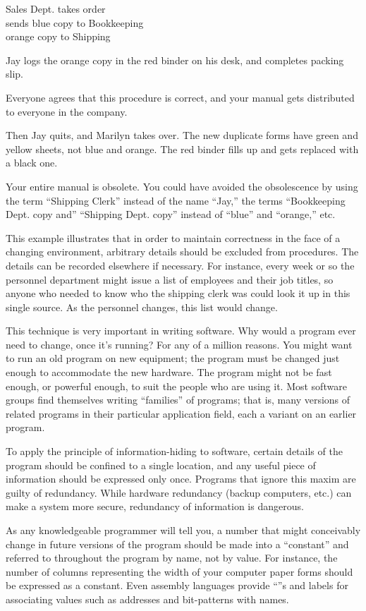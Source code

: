 \begin{tfquot}
Sales Dept. takes order\\
sends blue copy to Bookkeeping\\
orange copy to Shipping

Jay logs the orange copy in the red binder on his desk, and completes
packing slip.
\end{tfquot}
Everyone agrees that this procedure is correct, and your manual gets
distributed to everyone in the company.

Then Jay quits, and Marilyn takes over. The new duplicate forms have
green and yellow sheets, not blue and orange. The red binder fills up
and gets replaced with a black one.

Your entire manual is obsolete. You could have avoided the
obsolescence by using the term ``Shipping Clerk'' instead of the name
``Jay,'' the terms ``Bookkeeping Dept. copy and'' ``Shipping Dept.  copy''
instead of ``blue'' and ``orange,'' etc.

This example illustrates that in order to maintain correctness in the
face of a changing environment, arbitrary details should be excluded
from procedures. The details can be recorded elsewhere if necessary.
For instance, every week or so the personnel department might issue a
list of employees and their job titles, so anyone who needed to know
who the shipping clerk was could look it up in this single source.  As
the personnel changes, this list would change.

This technique is very important in writing software. Why would a
program ever need to change, once it's running? For any of a million
reasons. You might want to run an old program on new equipment; the
program must be changed just enough to accommodate the new hardware.
The program might not be fast enough, or powerful enough, to suit the
people who are using it. Most software groups find themselves writing
``families'' of programs; that is, many versions of related programs
in their particular application field, each a variant on an earlier
program. 

To apply the principle of information-hiding to software, certain
details of the program should be confined to a single location, and
any useful piece of information should be expressed only once.
Programs that ignore this maxim are guilty of redundancy. While
hardware redundancy (backup computers, etc.) can make a system more
secure, redundancy of information is dangerous.

As any knowledgeable programmer will tell you, a number that might
conceivably change in future versions of the program should be made
into a ``constant'' and referred to throughout the program by name,
not by value. For instance, the number of columns representing the
width of your computer paper forms should be expressed as a
constant. Even assembly languages provide ``''s and labels
for associating values such as addresses and bit-patterns with names.

